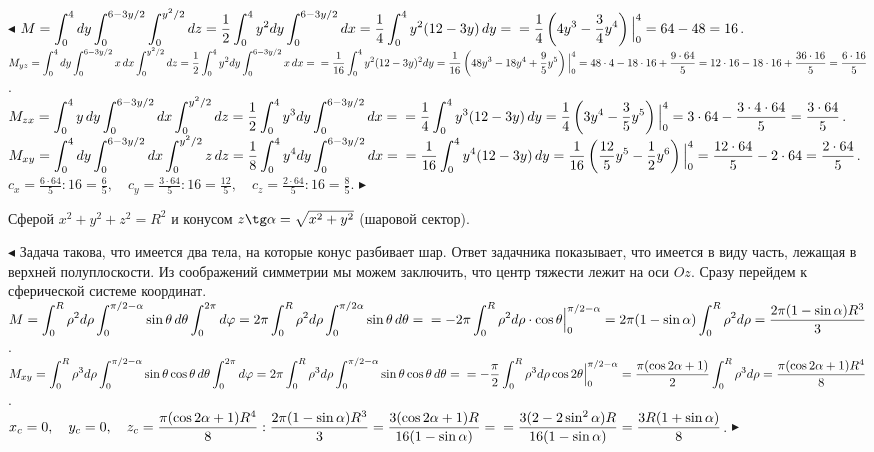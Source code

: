 \documentclass[a5paper,10pt]{article}
\begin{document}
\smallskip\noindent
$\blacktriangleleft$
$\displaystyle M=\int_0^4dy\int_0^{6-3y/2}\int_0^{y^2/2}dz=
\frac12\int_0^4y^2dy\int_0^{6-3y/2}dx=
\frac14\int_0^4y^2(12-3y)\,dy=\\
=\frac14\left(4y^3-\frac34y^4\right)\Big|_0^4=64-48=16$.\\
$\displaystyle M_{yz}=\int_0^4dy\int_0^{6-3y/2}x\,dx\int_0^{y^2/2}dz=
\frac12\int_0^4y^2dy\int_0^{6-3y/2}x\,dx=\\
=\frac{1}{16}\int_0^4y^2(12-3y)^2dy=
\frac{1}{16}\left(48y^3-18y^4+\frac95y^5\right)\Big|_0^4=\\
48\cdot4-18\cdot16+\frac{9\cdot64}{5}=12\cdot16-18\cdot16+\frac{36\cdot16}{5}=\frac{6\cdot16}{5}$.\\
$\displaystyle M_{zx}=\int_0^4y\,dy\int_0^{6-3y/2}dx\int_0^{y^2/2}dz=
\frac12\int_0^4y^3dy\int_0^{6-3y/2}dx=\\
=\frac14\int_0^4y^3(12-3y)\,dy=\frac14\left(3y^4-\frac35y^5\right)\Big|_0^4=
3\cdot64-\frac{3\cdot4\cdot64}{5}=\frac{3\cdot64}{5}$.\\
$\displaystyle M_{xy}=\int_0^4dy\int_0^{6-3y/2}dx\int_0^{y^2/2}z\,dz=
\frac18\int_0^4y^4dy\int_0^{6-3y/2}dx=\\
=\frac{1}{16}\int_0^4y^4(12-3y)\,dy=
\frac{1}{16}\left(\frac{12}{5}y^5-\frac12y^6\right)\Big|_0^4=
\frac{12\cdot64}{5}-2\cdot64=\frac{2\cdot64}{5}$.\\
$\displaystyle c_x=\frac{6\cdot64}{5}:16=\frac65,\quad
c_y=\frac{3\cdot64}{5}:16=\frac{12}{5},\quad c_z=\frac{2\cdot64}{5}:16=\frac85$.
$\blacktriangleright$

\medskip
{} Сферой $x^2+y^2+z^2=R^2$ и конусом
$z\tg\alpha=\sqrt{x^2+y^2}$ (шаровой сектор).

\smallskip\noindent
$\blacktriangleleft$ Задача такова, что имеется два тела, на которые конус разбивает
шар. Ответ задачника показывает, что имеется в виду часть, лежащая в верхней полуплоскости.
Из соображений симметрии мы можем заключить, что центр тяжести
лежит на оси $Oz$. Сразу перейдем к сферической системе координат.
$\displaystyle M=\int_0^R\rho^2d\rho\int_0^{\pi/2-\alpha}\sin\theta\,d\theta\int_0^{2\pi}d\varphi=
2\pi\int_0^R\rho^2d\rho\int_0^{\pi/2\alpha}\sin\theta\,d\theta=\\
=-2\pi\int_0^R\rho^2d\rho\cdot\cos\theta\Big|_0^{\pi/2-\alpha}=
2\pi(1-\sin\alpha)\int_0^R\rho^2d\rho=\frac{2\pi(1-\sin\alpha)R^3}{3}$.\\
$\displaystyle M_{xy}=\int_0^R\rho^3d\rho\int_0^{\pi/2-\alpha}\sin\theta\cos\theta\,d\theta\int_0^{2\pi}d\varphi=
2\pi\int_0^R\rho^3d\rho\int_0^{\pi/2-\alpha}\sin\theta\cos\theta\,d\theta=\\
=-\frac{\pi}{2}\int_0^R\rho^3d\rho \cos2\theta\Big|_0^{\pi/2-\alpha}=
\frac{\pi(\cos2\alpha+1)}{2}\int_0^R\rho^3d\rho=\frac{\pi(\cos2\alpha+1)R^4}{8}$.\\
$\displaystyle x_c=0,\quad y_c=0,\quad z_c=
\frac{\pi(\cos2\alpha+1)R^4}{8}:\frac{2\pi(1-\sin\alpha)R^3}{3}=
\frac{3(\cos2\alpha+1)R}{16(1-\sin\alpha)}=\\
=\frac{3(2-2\sin^2\alpha)R}{16(1-\sin\alpha)}=\frac{3R(1+\sin\alpha)}{8}$.
$\blacktriangleright$
\end{document}
